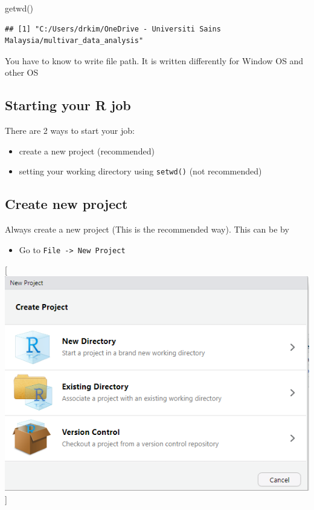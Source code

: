 \documentclass[
]{book}
\makeatletter
\newenvironment{Shaded}{\begin{snugshade}}{\end{snugshade}}
\newcommand{\FunctionTok}[1]{\textcolor[rgb]{0,0,0}{#1}}
\newcommand{\NormalTok}[1]{#1}
\providecommand{\tightlist}{%
  \setlength{\itemsep}{0pt}\setlength{\parskip}{0pt}}
\newenvironment{kframe}{%
\medskip{}
\setlength{\fboxsep}{.8em}
 \def\at@end@of@kframe{}%
 \ifinner\ifhmode%
  \def\at@end@of@kframe{\end{minipage}}%
  \begin{minipage}{\columnwidth}%
 \fi\fi%
 \def\FrameCommand##1{\hskip\@totalleftmargin \hskip-\fboxsep
 \colorbox{shadecolor}{##1}\hskip-\fboxsep
     \hskip-\linewidth \hskip-\@totalleftmargin \hskip\columnwidth}%
 \MakeFramed {\advance\hsize-\width
   \@totalleftmargin\z@ \linewidth\hsize
   \@setminipage}}%
 {\par\unskip\endMakeFramed%
 \at@end@of@kframe}
\renewenvironment{Shaded}{\begin{kframe}}{\end{kframe}}
\makeatother
\begin{document}
\begin{Shaded}
\begin{Highlighting}[]
\FunctionTok{getwd}\NormalTok{()}
\end{Highlighting}
\end{Shaded}

\begin{verbatim}
## [1] "C:/Users/drkim/OneDrive - Universiti Sains Malaysia/multivar_data_analysis"
\end{verbatim}

You have to know to write file path. It is written differently for Window OS and other OS

\hypertarget{starting-your-r-job}{%
\subsection{Starting your R job}\label{starting-your-r-job}}

There are 2 ways to start your job:

\begin{itemize}
\tightlist
\item
  create a new project (recommended)
\item
  setting your working directory using \texttt{setwd()} (not recommended)
\end{itemize}

\hypertarget{create-new-project}{%
\subsection{Create new project}\label{create-new-project}}

Always create a new project (This is the recommended way). This can be by

\begin{itemize}
\tightlist
\item
  Go to \texttt{File\ -\textgreater{}\ New\ Project}
\end{itemize}

{[}\includegraphics{new_proj.PNG}{]}
\end{document}
